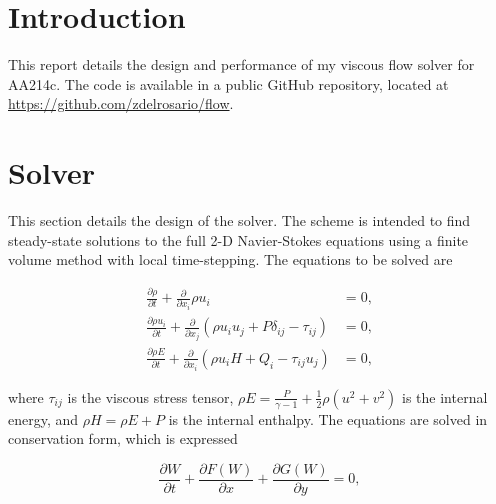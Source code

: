 \documentclass{article}
\begin{document}



\section{Introduction}
This report details the design and performance of my viscous flow solver for AA214c. The code is available in a public GitHub repository, located at \url{https://github.com/zdelrosario/flow}.

\section{Solver}
This section details the design of the solver. The scheme is intended to find steady-state solutions to the full 2-D Navier-Stokes equations using a finite volume method with local time-stepping. The equations to be solved are

\begin{equation}
\begin{aligned}
\frac{\partial \rho}{\partial t} + \frac{\partial}{\partial x_i} \rho u_i &= 0, \\
\frac{\partial \rho u_i}{\partial t} + \frac{\partial}{\partial x_j}\left(\rho u_iu_j + P\delta_{ij} - \tau_{ij} \right) &= 0, \\
\frac{\partial \rho E}{\partial t} + \frac{\partial}{\partial x_i}\left(\rho u_i H + Q_i - \tau_{ij}u_j\right) &= 0,
\end{aligned}
\end{equation}

where $\tau_{ij}$ is the viscous stress tensor, $\rho E=\frac{P}{\gamma-1}+\frac{1}{2}\rho(u^2+v^2)$ is the internal energy, and $\rho H=\rho E+P$ is the internal enthalpy. The equations are solved in conservation form, which is expressed

\begin{equation}
\frac{\partial W}{\partial t} + \frac{\partial F(W)}{\partial x} + \frac{\partial G(W)}{\partial y} = 0,
\end{equation}
\end{document}

